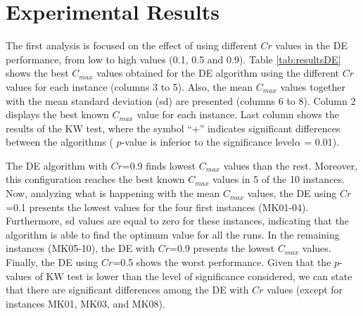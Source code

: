 

\section{Experimental Results}%
\vspace{-0.4cm}
The first analysis is focused on the effect of using different $Cr$ values in the DE performance, from low to high values (0.1, 0.5 and 0.9). %
Table \ref{tab:resultsDE} shows the best $C_{max}$ values obtained for the DE algorithm using the different $Cr$ values for each instance (columns 3 to 5). Also, the mean $C_{max}$ values together with the mean standard deviation (sd) are presented (columns 6 to 8). Column 2 displays the best known $C_{max}$ value for each instance. Last column shows the results of the KW test, where
the symbol ``+'' indicates significant differences between the algorithms ( $p$-value is inferior to the significance  level$\alpha$ = 0.01). %

The DE algorithm with $Cr$=0.9 finds lowest $C_{max}$ values than the rest. Moreover, this configuration reaches the best known $C_{max}$ values in 5 of the 10 instances. Now, analyzing what is happening with the mean $C_{max}$ values, the DE using $Cr$=0.1 presents the lowest values for the four first instances (MK01-04). Furthermore, sd values are equal to zero for these instances, indicating that the algorithm is able to find the optimum value for all the runs. In the remaining instances (MK05-10), the DE with $Cr$=0.9 presents the lowest $C_{max}$ values. Finally, the DE using $Cr$=0.5 shows the worst performance. Given that the $p$-values of KW test is lower than the level of significance considered, we can state that there are significant differences among the DE with $Cr$ values (except for instances MK01, MK03, and MK08).  %

